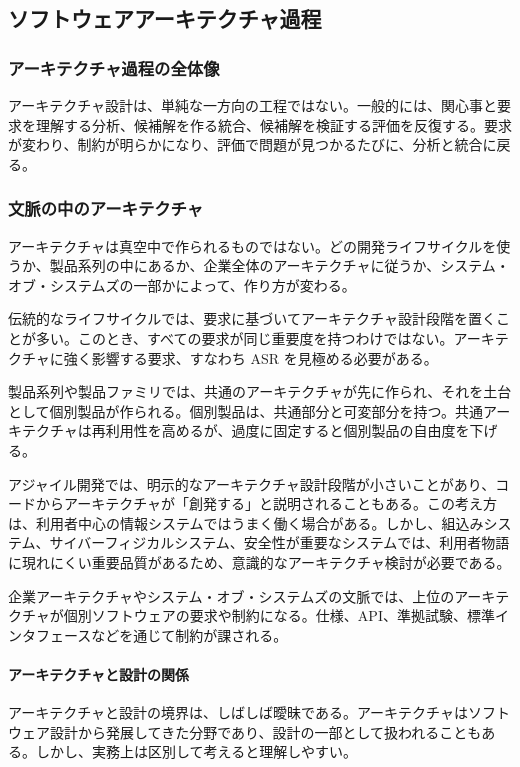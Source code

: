 \subsection{ソフトウェアアーキテクチャ過程}

\subsubsection*{アーキテクチャ過程の全体像}
アーキテクチャ設計は、単純な一方向の工程ではない。一般的には、関心事と要求を理解する分析、候補解を作る統合、候補解を検証する評価を反復する。要求が変わり、制約が明らかになり、評価で問題が見つかるたびに、分析と統合に戻る。

\subsubsection{文脈の中のアーキテクチャ}
アーキテクチャは真空中で作られるものではない。どの開発ライフサイクルを使うか、製品系列の中にあるか、企業全体のアーキテクチャに従うか、システム・オブ・システムズの一部かによって、作り方が変わる。

伝統的なライフサイクルでは、要求に基づいてアーキテクチャ設計段階を置くことが多い。このとき、すべての要求が同じ重要度を持つわけではない。アーキテクチャに強く影響する要求、すなわち ASR を見極める必要がある。

製品系列や製品ファミリでは、共通のアーキテクチャが先に作られ、それを土台として個別製品が作られる。個別製品は、共通部分と可変部分を持つ。共通アーキテクチャは再利用性を高めるが、過度に固定すると個別製品の自由度を下げる。

アジャイル開発では、明示的なアーキテクチャ設計段階が小さいことがあり、コードからアーキテクチャが「創発する」と説明されることもある。この考え方は、利用者中心の情報システムではうまく働く場合がある。しかし、組込みシステム、サイバーフィジカルシステム、安全性が重要なシステムでは、利用者物語に現れにくい重要品質があるため、意識的なアーキテクチャ検討が必要である。

企業アーキテクチャやシステム・オブ・システムズの文脈では、上位のアーキテクチャが個別ソフトウェアの要求や制約になる。仕様、API、準拠試験、標準インタフェースなどを通じて制約が課される。

\paragraph{アーキテクチャと設計の関係}
アーキテクチャと設計の境界は、しばしば曖昧である。アーキテクチャはソフトウェア設計から発展してきた分野であり、設計の一部として扱われることもある。しかし、実務上は区別して考えると理解しやすい。

